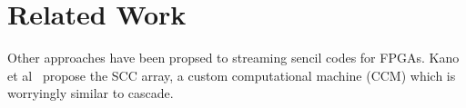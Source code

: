 \section{Related Work}

Other approaches have been propsed to streaming sencil codes for FPGAs.
Kano et al~\cite{sano:2014aa} propose the SCC array, a custom computational machine (CCM) which is worryingly similar to cascade.
